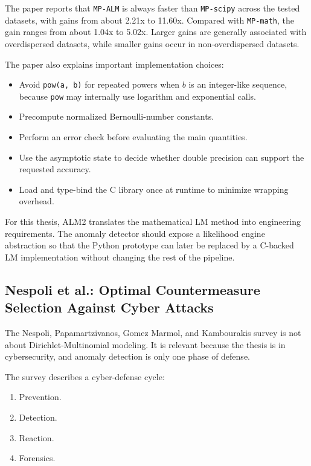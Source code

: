 \documentclass[11pt,a4paper]{article}
\begin{document}
The paper reports that \texttt{MP-ALM} is always faster than \texttt{MP-scipy} across the tested datasets, with gains from about 2.21x to 11.60x. Compared with \texttt{MP-math}, the gain ranges from about 1.04x to 5.02x. Larger gains are generally associated with overdispersed datasets, while smaller gains occur in non-overdispersed datasets.

The paper also explains important implementation choices:

\begin{itemize}
  \item Avoid \texttt{pow(a, b)} for repeated powers when \(b\) is an integer-like sequence, because \texttt{pow} may internally use logarithm and exponential calls.
  \item Precompute normalized Bernoulli-number constants.
  \item Perform an error check before evaluating the main quantities.
  \item Use the asymptotic state to decide whether double precision can support the requested accuracy.
  \item Load and type-bind the C library once at runtime to minimize wrapping overhead.
\end{itemize}

For this thesis, ALM2 translates the mathematical LM method into engineering requirements. The anomaly detector should expose a likelihood engine abstraction so that the Python prototype can later be replaced by a C-backed LM implementation without changing the rest of the pipeline.

\subsection{Nespoli et al.: Optimal Countermeasure Selection Against Cyber Attacks}

The Nespoli, Papamartzivanos, Gomez Marmol, and Kambourakis survey is not about Dirichlet-Multinomial modeling. It is relevant because the thesis is in cybersecurity, and anomaly detection is only one phase of defense.

The survey describes a cyber-defense cycle:

\begin{enumerate}
  \item Prevention.
  \item Detection.
  \item Reaction.
  \item Forensics.
\end{enumerate}
\end{document}
